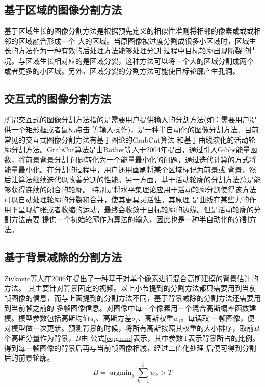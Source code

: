 \subsection{基于区域的图像分割方法}
	基于区域生长的图像分割方法是根据预先定义的相似性准则将相邻的像素或或或相邻的区域融合形成一个
	大的区域。当原图像被过度分割成很多小区域时，区域生长的方法作为一种有效的后处理方法能够处理分割
	过程中目标轮廓出现断裂的情况。与区域生长相对应的是区域分裂，这种方法可以将一个大的区域分割成两个
	或者更多的小区域。另外，区域分裂的分割方法可能使目标轮廓产生孔洞。
\subsection{交互式的图像分割方法}
	所谓交互式的图像分割方法指的是需要用户提供输入的分割方法(如：需要用户提供一个矩形框或者鼠标点击
	等输入操作)，是一种半自动化的图像分割方法。目前常见的交互式图像分割方法有基于图论的GrabCut算法\cite{rother2004grabcut}
	和基于曲线演化的活动轮廓分割方法。GrabCut算法是由Rother等人于2004年提出，通过引入Gibbs能量函数，将前景背景分割
	问题转化为一个能量最小化的问题，通过迭代计算的方式将能量最小化。在分割的过程中，用户还用画刷将某个区域标记为前景或
	背景，然后让算法继续迭代以改善分割的性能。另一方面，基于活动轮廓的分割方法总是能够获得连续的闭合的轮廓。
	特别是将水平集理论应用于活动轮廓分割使得该方法可以自动处理轮廓的分裂和合并，使其更具灵活性。其原理
	是曲线在某些力的作用下呈现扩张或者收缩的运动，最终会收敛于目标轮廓的边缘。但是活动轮廓的分割方法需要
	提供一个初始轮廓作为算法的输入，因此也是一种半自动化的分割方法。
\subsection{基于背景减除的分割方法}
	Zivkovic等人\cite{zivkovic2006efficient}在2006年提出了一种基于对单个像素进行混合高斯建模的背景估计的方法。
	其主要针对背景固定的视频。以上小节提到的分割方法都只需要用到当前帧图像的信息，而与上面提到的分割方法不同，基于背景减除的分割方法还需要用到当前帧之前的
	多帧图像信息。对图像中每一个像素用一个混合高斯概率函数建模。模型参数包括高斯均值$u_i$、高斯方差$\sigma_i$、高斯权重$w_i$。每读取
	一帧图像，便对模型做一次更新。预测背景的时候，将所有高斯按照其权重的大小排序，取前$B$个高斯分量作为背景，$B$由
	公式\ref{eq:gmm}表示，其中参数T表示背景所占的比例。得到每一帧图像的背景后再与当前帧图像相减，经过二值化处理
	后便可得到分割后的前景轮廓。
	\begin{equation}
	B=\mathop{\arg\min}_{b} \sum_{k=1}^b w_k>T \label{eq:gmm}
	\end{equation}
